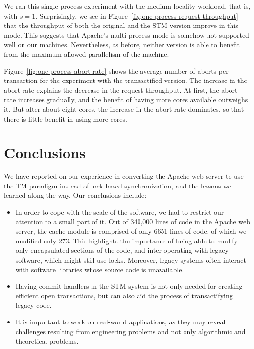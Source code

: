 \documentclass[11pt]{sigplanconf}
\begin{document}
We ran this single-process experiment with the medium locality workload,
that is, with $s=1$. Surprisingly, we see
in Figure~\ref{fig:one-process-request-throughput} that the
throughput of both the original and the STM version improve in this mode.
This suggests that Apache's multi-process mode is somehow not supported
well on our machines. Nevertheless, as before, neither version is able to 
benefit from the maximum allowed parallelism of the machine. 

Figure~\ref{fig:one-process-abort-rate} shows the average number of aborts
per transaction for the experiment with the transactified version. 
The increase in the abort rate explains the decrease in the request
throughput. At first, the abort rate increases gradually, 
and the benefit of having more cores available outweighs it.
But after about eight cores, the increase in the abort rate dominates,
so that there is little benefit in using more cores. 

\section{Conclusions}\label{sec:conclusions}

We have reported on our experience in converting the Apache web 
server to use the TM paradigm instead of lock-based synchronization,
and the lessons we learned along the way. Our conclusions include:

\begin{itemize}

\item
In order to cope with the scale of the software, we had to restrict
our attention to a small part of it. 
Out of 340,000 lines of code in the Apache web server, the cache module
is comprised of only 6651 lines of code, of which we modified only 273. 
This highlights the importance of being able to modify only
encapsulated sections of the code, and inter-operating with legacy software,
which might still use locks.  Moreover, legacy systems often interact
with software libraries whose source code is unavailable. 

  \item Having commit handlers in the STM system is not only needed for creating
efficient open transactions, but can also aid the process of transactifying
legacy code.

  \item It is important to work on real-world applications, as they
may reveal challenges resulting from engineering problems and not only
algorithmic and theoretical problems.

\end{itemize}
\end{document}
